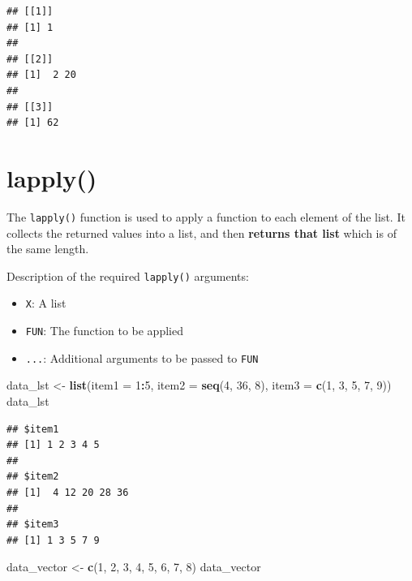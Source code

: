 \documentclass[
]{book}
\newenvironment{Shaded}{\begin{snugshade}}{\end{snugshade}}
\newcommand{\DataTypeTok}[1]{\textcolor[rgb]{0.13,0.29,0.53}{#1}}
\newcommand{\DecValTok}[1]{\textcolor[rgb]{0.00,0.00,0.81}{#1}}
\newcommand{\KeywordTok}[1]{\textcolor[rgb]{0.13,0.29,0.53}{\textbf{#1}}}
\newcommand{\NormalTok}[1]{#1}
\newcommand{\OperatorTok}[1]{\textcolor[rgb]{0.81,0.36,0.00}{\textbf{#1}}}
\newcommand{\StringTok}[1]{\textcolor[rgb]{0.31,0.60,0.02}{#1}}
\providecommand{\tightlist}{%
  \setlength{\itemsep}{0pt}\setlength{\parskip}{0pt}}
\begin{document}
\begin{verbatim}
## [[1]]
## [1] 1
## 
## [[2]]
## [1]  2 20
## 
## [[3]]
## [1] 62
\end{verbatim}

\hypertarget{lapply}{%
\section{lapply()}\label{lapply}}

The \texttt{lapply()} function is used to apply a function to each element of the list. It collects the returned values into a list, and then \textbf{returns that list} which is of the same length.

Description of the required \texttt{lapply()} arguments:

\begin{itemize}
\tightlist
\item
  \texttt{X}: A list
\item
  \texttt{FUN}: The function to be applied
\item
  \texttt{...}: Additional arguments to be passed to \texttt{FUN}
\end{itemize}

\begin{Shaded}
\begin{Highlighting}[]
\NormalTok{data_lst <-}\StringTok{ }\KeywordTok{list}\NormalTok{(}\DataTypeTok{item1 =} \DecValTok{1}\OperatorTok{:}\DecValTok{5}\NormalTok{, }\DataTypeTok{item2 =} \KeywordTok{seq}\NormalTok{(}\DecValTok{4}\NormalTok{, }\DecValTok{36}\NormalTok{, }\DecValTok{8}\NormalTok{), }\DataTypeTok{item3 =} \KeywordTok{c}\NormalTok{(}\DecValTok{1}\NormalTok{,}
    \DecValTok{3}\NormalTok{, }\DecValTok{5}\NormalTok{, }\DecValTok{7}\NormalTok{, }\DecValTok{9}\NormalTok{))}
\NormalTok{data_lst}
\end{Highlighting}
\end{Shaded}

\begin{verbatim}
## $item1
## [1] 1 2 3 4 5
## 
## $item2
## [1]  4 12 20 28 36
## 
## $item3
## [1] 1 3 5 7 9
\end{verbatim}

\begin{Shaded}
\begin{Highlighting}[]
\NormalTok{data_vector <-}\StringTok{ }\KeywordTok{c}\NormalTok{(}\DecValTok{1}\NormalTok{, }\DecValTok{2}\NormalTok{, }\DecValTok{3}\NormalTok{, }\DecValTok{4}\NormalTok{, }\DecValTok{5}\NormalTok{, }\DecValTok{6}\NormalTok{, }\DecValTok{7}\NormalTok{, }\DecValTok{8}\NormalTok{)}
\NormalTok{data_vector}
\end{Highlighting}
\end{Shaded}
\end{document}
